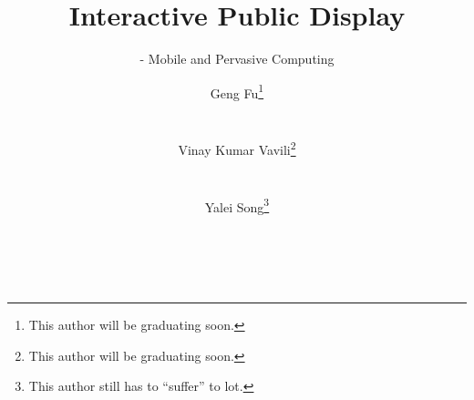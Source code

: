 \documentclass{sig-alternate}
\begin{document}
\title{Interactive Public Display}
\subtitle{- Mobile and Pervasive Computing}
%
%
%
%
%

%
\author{
%
%
Geng Fu\thanks{This author will be graduating soon.}\\
	\\
	\\
\alignauthor
Vinay Kumar Vavili\thanks{This author will be graduating soon.}\\
	\\
	\\
\alignauthor
Yalei Song\thanks{This author still has to ``suffer'' to lot.}\\
	\\
	\\
}
\end{document}
